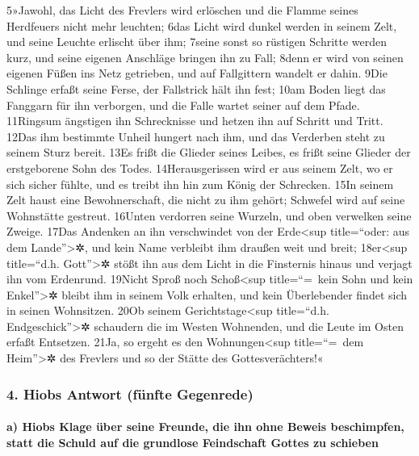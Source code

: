 5»Jawohl, das Licht des Frevlers wird erlöschen und die Flamme seines
Herdfeuers nicht mehr leuchten; 6das Licht wird dunkel werden in seinem
Zelt, und seine Leuchte erlischt über ihm; 7seine sonst so rüstigen
Schritte werden kurz, und seine eigenen Anschläge bringen ihn zu Fall;
8denn er wird von seinen eigenen Füßen ins Netz getrieben, und auf
Fallgittern wandelt er dahin. 9Die Schlinge erfaßt seine Ferse, der
Fallstrick hält ihn fest; 10am Boden liegt das Fanggarn für ihn
verborgen, und die Falle wartet seiner auf dem Pfade. 11Ringsum
ängstigen ihn Schrecknisse und hetzen ihn auf Schritt und Tritt. 12Das
ihm bestimmte Unheil hungert nach ihm, und das Verderben steht zu seinem
Sturz bereit. 13Es frißt die Glieder seines Leibes, es frißt seine
Glieder der erstgeborene Sohn des Todes. 14Herausgerissen wird er aus
seinem Zelt, wo er sich sicher fühlte, und es treibt ihn hin zum König
der Schrecken. 15In seinem Zelt haust eine Bewohnerschaft, die nicht zu
ihm gehört; Schwefel wird auf seine Wohnstätte gestreut. 16Unten
verdorren seine Wurzeln, und oben verwelken seine Zweige. 17Das Andenken
an ihn verschwindet von der Erde\textless sup title=``oder: aus dem
Lande''\textgreater✲, und kein Name verbleibt ihm draußen weit und
breit; 18er\textless sup title=``d.h. Gott''\textgreater✲ stößt ihn aus
dem Licht in die Finsternis hinaus und verjagt ihn vom Erdenrund.
19Nicht Sproß noch Schoß\textless sup title=``=~kein Sohn und kein
Enkel''\textgreater✲ bleibt ihm in seinem Volk erhalten, und kein
Überlebender findet sich in seinen Wohnsitzen. 20Ob seinem
Gerichtstage\textless sup title=``d.h. Endgeschick''\textgreater✲
schaudern die im Westen Wohnenden, und die Leute im Osten erfaßt
Entsetzen. 21Ja, so ergeht es den Wohnungen\textless sup title=``=~dem
Heim''\textgreater✲ des Frevlers und so der Stätte des
Gottesverächters!«

\hypertarget{hiobs-antwort-fuxfcnfte-gegenrede}{%
\subsubsection{4. Hiobs Antwort (fünfte
Gegenrede)}\label{hiobs-antwort-fuxfcnfte-gegenrede}}

\hypertarget{a-hiobs-klage-uxfcber-seine-freunde-die-ihn-ohne-beweis-beschimpfen-statt-die-schuld-auf-die-grundlose-feindschaft-gottes-zu-schieben}{%
\paragraph{a) Hiobs Klage über seine Freunde, die ihn ohne Beweis
beschimpfen, statt die Schuld auf die grundlose Feindschaft Gottes zu
schieben}\label{a-hiobs-klage-uxfcber-seine-freunde-die-ihn-ohne-beweis-beschimpfen-statt-die-schuld-auf-die-grundlose-feindschaft-gottes-zu-schieben}}


